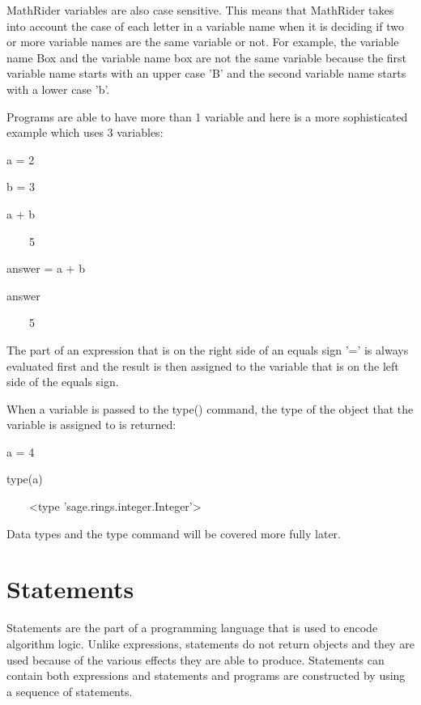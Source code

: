 \documentclass[12pt,oneside]{book}
\begin{document}
MathRider variables are also case sensitive. This means that MathRider takes into account the case of each letter in a variable name when it is deciding if two or more variable names are the same variable or not. For example, the variable name Box and the variable name box are not the same variable because the first variable name starts with an upper case 'B' and the second variable name starts with a lower case 'b'. 

Programs are able to have more than 1 variable and here is a more sophisticated example which uses 3 variables: 

a = 2

{\textbar}


b = 3

{\textbar}


a + b

{\textbar}

\ \ \ \ 5


answer = a + b

{\textbar}


answer

{\textbar}

\ \ \ \ 5


The part of an expression that is on the right side of an equals sign '=' is always evaluated first and the result is then assigned to the variable that is on the left side of the equals sign. 

When a variable is passed to the type() command, the type of the object that the variable is assigned to is returned: 

a = 4

type(a)

{\textbar}

\ \ \ \ {\textless}type
'sage.rings.integer.Integer'{\textgreater}


Data types and the type command will be covered more fully later.

\section[Statements]{Statements}

Statements are the part of a programming language that is used to encode algorithm logic. Unlike expressions, statements do not return objects and they are used because of the various effects they are able to produce. Statements can contain both expressions and statements and programs are constructed by using a sequence of statements.
\end{document}
